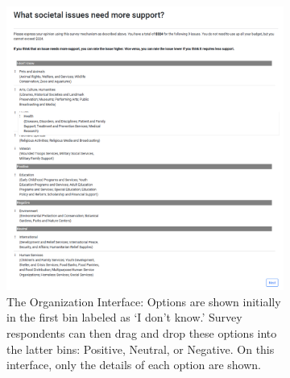 \begin{figure}[h]
    \centering
    \begin{subfigure}[b]{0.48\textwidth}
        \centering
        \includegraphics[width=\textwidth]{content/image/prototypes/4.1_grouping.png}
        \caption{The Organization Interface: Options are shown initially in the first bin labeled as `I don't know.' Survey respondents can then drag and drop these options into the latter bins: Positive, Neutral, or Negative. On this interface, only the details of each option are shown.}
        \label{fig:qv_org_p1}
    \end{subfigure}
    \hfill
    \begin{subfigure}[b]{0.48\textwidth}
        \centering

\end{subfigure}
\end{figure}
